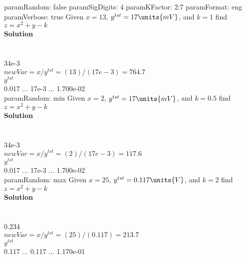 paramRandom: false
paramSigDigits: 4
paramKFactor: 2:7
paramFormat: eng
paramVerbose: true
\question Given \mbox{$x = 13$}, \mbox{$y^{tst} = \mbox{$17 \units{m V}$}$}, and \mbox{$k = 1$} find $z = x^2+y-k$\\
\textbf{Solution}\\
\\ 
\\
34e-3\\
\mbox{$newVar = x/y^{tst}  =  (13)/(17e-3) = 764.7$}\\
\mbox{$y^{tst}$}\\
0.017 ... 17e-3 ... 1.700e-02\\

paramRandom: min
\question Given \mbox{$x = 2$}, \mbox{$y^{tst} = \mbox{$17 \units{m V}$}$}, and \mbox{$k = 0.5$} find $z = x^2+y-k$\\
\textbf{Solution}\\
\\ 
\\
34e-3\\
\mbox{$newVar = x/y^{tst}  =  (2)/(17e-3) = 117.6$}\\
\mbox{$y^{tst}$}\\
0.017 ... 17e-3 ... 1.700e-02\\

paramRandom: max
\question Given \mbox{$x = 25$}, \mbox{$y^{tst} = \mbox{$0.117 \units{ V}$}$}, and \mbox{$k = 2$} find $z = x^2+y-k$\\
\textbf{Solution}\\
\\ 
\\
0.234\\
\mbox{$newVar = x/y^{tst}  =  (25)/(0.117) = 213.7$}\\
\mbox{$y^{tst}$}\\
0.117 ... 0.117 ... 1.170e-01\\

